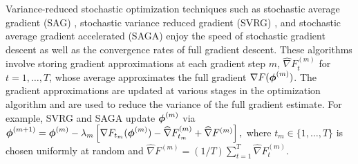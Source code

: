 Variance-reduced stochastic optimization techniques such as stochastic average gradient (SAG) \citep{Schmidt:2017}, stochastic variance reduced gradient (SVRG) \citep{Johnson:2013}, and stochastic average gradient accelerated (SAGA) \citep{Defazio:2014} enjoy the speed of stochastic gradient descent as well as the convergence rates of full gradient descent. These algorithms involve storing gradient approximations at each gradient step $m$, $\widehat \nabla F_{t}^{(m)}$ for $t = 1,\ldots,T$, whose average approximates the full gradient $\nabla F(\boldsymbol{\phi}^{(m)})$. The gradient approximations are updated at various stages in the optimization algorithm and are used to reduce the variance of the full gradient estimate. 
%
%
For example, SVRG and SAGA update $\boldsymbol{\phi}^{(m)}$ via
%
    $\boldsymbol{\phi}^{(m+1)} = \boldsymbol{\phi}^{(m)} - \lambda_m \left[\nabla F_{t_m}(\boldsymbol{\phi}^{(m)}) - \widehat \nabla F_{t_m}^{(m)} + \widehat \nabla F^{(m)} \right],$
%
where $t_m \in \{1,\ldots,T\}$ is chosen uniformly at random and
%
    $\widehat \nabla F^{(m)} = (1/T) \sum_{t=1}^T \widehat \nabla F_{t}^{(m)}$.
%
